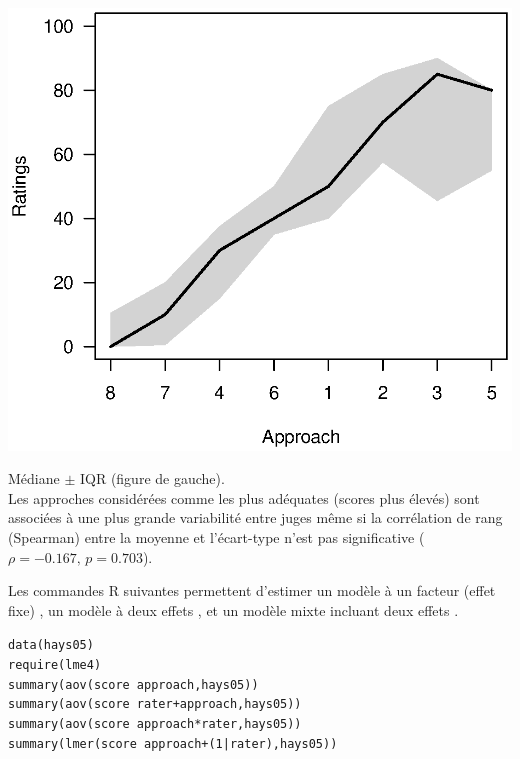 \foilhead{}
\begin{minipage}{0.45\textwidth}
\centerline{\includegraphics[scale=.85]{./figs/hays05.eps}}
\end{minipage}\hfill
\begin{minipage}{0.5\textwidth}
\small
Médiane $\pm$ IQR (figure de gauche).\\
Les approches considérées comme les plus adéquates (scores plus élevés) sont
associées à une plus grande variabilité entre juges même si la corrélation de
rang (Spearman) entre la moyenne et l'écart-type n'est pas significative
($\rho=-0.167,\, p=0.703$). 
\end{minipage}


Les commandes R suivantes permettent d'estimer un modèle à un facteur (effet
fixe) , un modèle à deux effets , et un modèle mixte
incluant deux effets . 

\begin{alltt}
data(hays05)
require(lme4)
summary(aov(score~approach, hays05)) \hfill{}
summary(aov(score~rater+approach, hays05)) \hfill{}
summary(aov(score~approach*rater, hays05)) \hfill{}
summary(lmer(score~approach+(1|rater), hays05)) \hfill{}
\end{alltt}

